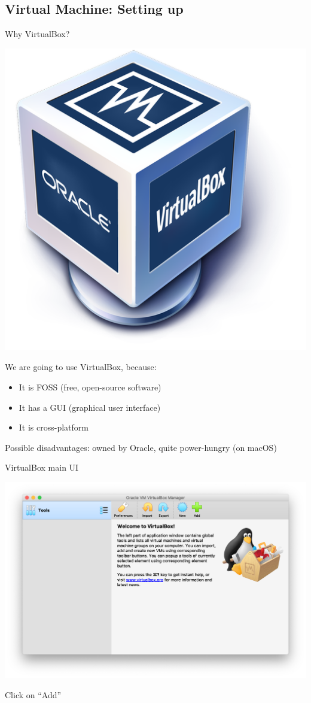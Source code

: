 \documentclass[12pt]{beamer}
\begin{document}
\subsection{Virtual Machine: Setting up}
\begin{frame}{Why VirtualBox?}
  \begin{center}
    \includegraphics[width=0.25\linewidth]{virtualbox}
  \end{center}

  We are going to use VirtualBox, because:
  \begin{itemize}
    \item It is FOSS (free, open-source software)
    \item It has a GUI (graphical user interface)
    \item It is cross-platform
  \end{itemize}

  Possible disadvantages: owned by Oracle, quite power-hungry (on macOS)
\end{frame}

\begin{frame}{VirtualBox main UI}
  \begin{center}
    \includegraphics[width=0.8\linewidth]{vb-main}
  \end{center}
  Click on ``Add''
\end{frame}
\end{document}
